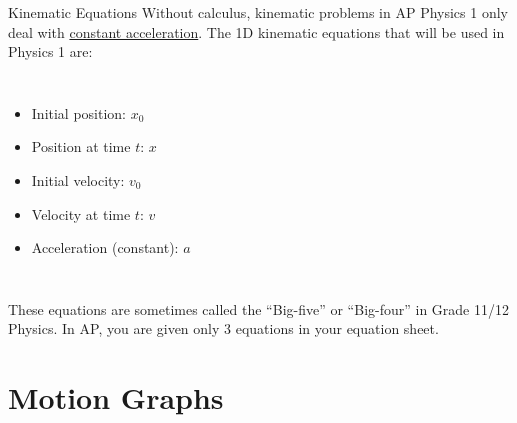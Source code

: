 \documentclass[12pt,compress,aspectratio=169]{beamer}
\begin{document}
\begin{frame}{Kinematic Equations}
  Without calculus, kinematic problems in AP Physics 1 only deal with
  \underline{constant acceleration}.
  The 1D kinematic equations that will be used in Physics 1 are:
  \begin{columns}

    \vspace{-.3in}{\Large
      \begin{align*}
        x &= x_0+ v_0t + \frac12at^2\\
        v &= v_0+at\\
        v^2 &= v_0^2+ 2a(x-x_0)
      \end{align*}
    }
    
    \begin{itemize}
    \item Initial position: $x_0$
    \item Position at time $t$: $x$
    \item Initial velocity: $v_0$
    \item Velocity at time $t$: $v$
    \item Acceleration (constant): $a$
    \end{itemize}
  \end{columns}
  These equations are sometimes called the ``Big-five'' or ``Big-four''
  in Grade 11/12 Physics. In AP, you are given only 3 equations in your
  equation sheet.
\end{frame}



\section{Motion Graphs}
\end{document}
